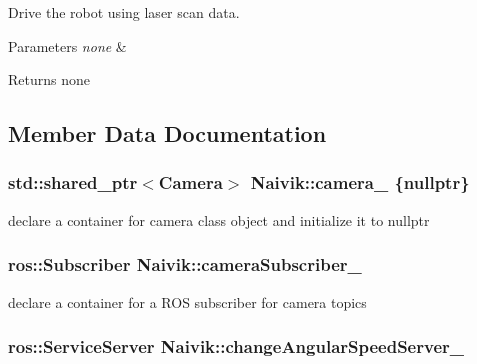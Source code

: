 Drive the robot using laser scan data. 


\begin{DoxyParams}{Parameters}
{\em none} & \\
\hline
\end{DoxyParams}
\begin{DoxyReturn}{Returns}
none 
\end{DoxyReturn}


\subsection{Member Data Documentation}
\subsubsection[{\texorpdfstring{camera\+\_\+}{camera_}}]{\setlength{\rightskip}{0pt plus 5cm}std\+::shared\+\_\+ptr$<${\bf Camera}$>$ Naivik\+::camera\+\_\+ \{nullptr\}\hspace{0.3cm}{\ttfamily [private]}}\hypertarget{classNaivik_a59456579fab04d7c934dc8826d36821b}{}\label{classNaivik_a59456579fab04d7c934dc8826d36821b}


declare a container for camera class object and initialize it to nullptr 

\subsubsection[{\texorpdfstring{camera\+Subscriber\+\_\+}{cameraSubscriber_}}]{\setlength{\rightskip}{0pt plus 5cm}ros\+::\+Subscriber Naivik\+::camera\+Subscriber\+\_\+\hspace{0.3cm}{\ttfamily [private]}}\hypertarget{classNaivik_ab37285b13d04a193f38b2d05a3303694}{}\label{classNaivik_ab37285b13d04a193f38b2d05a3303694}


declare a container for a R\+OS subscriber for camera topics 

\subsubsection[{\texorpdfstring{change\+Angular\+Speed\+Server\+\_\+}{changeAngularSpeedServer_}}]{\setlength{\rightskip}{0pt plus 5cm}ros\+::\+Service\+Server Naivik\+::change\+Angular\+Speed\+Server\+\_\+\hspace{0.3cm}{\ttfamily [private]}}\hypertarget{classNaivik_a6ead6207d0ce5ef49caa1ad8d1d1fcaa}{}\label{classNaivik_a6ead6207d0ce5ef49caa1ad8d1d1fcaa}


